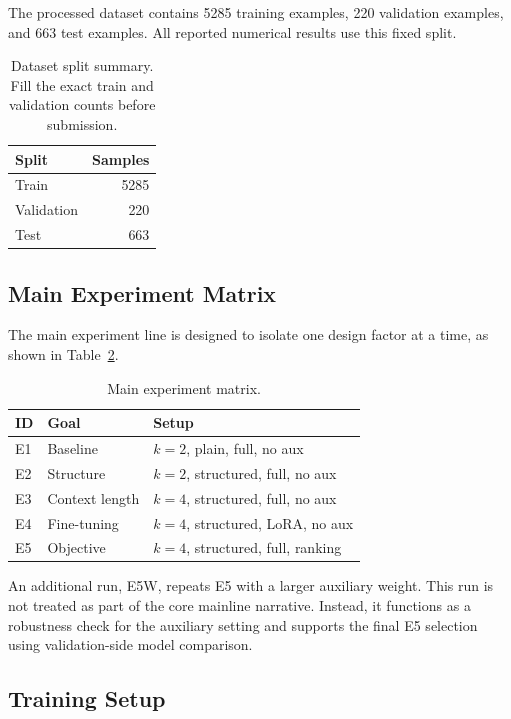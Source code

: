 \documentclass{article}
\newcommand{\expid}[1]{\textsc{#1}}
\newcommand{\traincount}{5285}
\newcommand{\valcount}{220}
\newcommand{\testcount}{663}
\begin{document}
The processed dataset contains \traincount{} training examples, \valcount{} validation examples, and \testcount{} test examples. All reported numerical results use this fixed split.

\begin{table}[t]
\caption{Dataset split summary. Fill the exact train and validation counts before submission.}
\label{tab:dataset}
\centering
\begin{tabular}{lr}
\toprule
Split & Samples \\
\midrule
Train & \traincount \\
Validation & \valcount \\
Test & \testcount \\
\bottomrule
\end{tabular}
\end{table}

\subsection{Main Experiment Matrix}

The main experiment line is designed to isolate one design factor at a time, as shown in Table~\ref{tab:matrix}.

\begin{table}[t]
\caption{Main experiment matrix.}
\label{tab:matrix}
\centering
\scriptsize
\begin{tabular}{lll}
\toprule
ID & Goal & Setup \\
\midrule
\expid{E1} & Baseline & $k=2$, plain, full, no aux \\
\expid{E2} & Structure & $k=2$, structured, full, no aux \\
\expid{E3} & Context length & $k=4$, structured, full, no aux \\
\expid{E4} & Fine-tuning & $k=4$, structured, LoRA, no aux \\
\expid{E5} & Objective & $k=4$, structured, full, ranking \\
\bottomrule
\end{tabular}
\end{table}

An additional run, \expid{E5W}, repeats \expid{E5} with a larger auxiliary weight. This run is not treated as part of the core mainline narrative. Instead, it functions as a robustness check for the auxiliary setting and supports the final \expid{E5} selection using validation-side model comparison.

\subsection{Training Setup}
\end{document}
